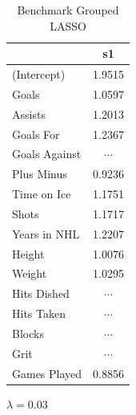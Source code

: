 \documentclass[10pt]{article}
\begin{document}
{{{{\begin{table}[tph]
\caption{\label{tab:benchmark-grouped}Benchmark Grouped LASSO}
\centering
\begin{threeparttable}
\begin{tabular}[t]{lc}
\toprule
 & s1 \\ 
  \midrule
(Intercept) & 1.9515\\ 
  Goals & 1.0597\\ 
  Assists & 1.2013 \\ 
  Goals For & 1.2367  \\ 
  Goals Against & $\cdots$ \\ 
  Plus Minus & 0.9236 \\ 
  Time on Ice & 1.1751 \\ 
  Shots & 1.1717  \\ 
  Years in NHL & 1.2207 \\ 
  Height & 1.0076 \\ 
  Weight & 1.0295 \\ 
  Hits Dished &  $\cdots$ \\ 
  Hits Taken &  $\cdots$ \\ 
  Blocks &  $\cdots$   \\ 
  Grit &  $\cdots$  \\ 
  Games Played & 0.8856 \\ 
\bottomrule
\end{tabular}
    \begin{tablenotes}
      \item $\lambda = 0.03$
    \end{tablenotes}
  \end{threeparttable}    
\end{table}

}}}}
\end{document}
